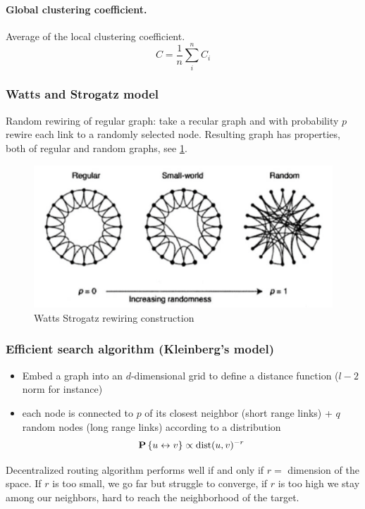 \paragraph{Global clustering coefficient.}
  Average of the local clustering coefficient.
  \[
    C = \frac 1 n \sum_i^n C_i
  \]

\subsubsection{Watts and Strogatz model}

Random rewiring of regular graph: take a recular graph and with probability $p$ rewire each link to a randomly selected node. Resulting graph has properties, both of regular and random graphs, see \cref{fig:watts_strogatz}.

\begin{figure}
  \centering
  \includegraphics[width=1\linewidth]{figures/watts_strogatz_graph.png}
  \caption{Watts Strogatz rewiring construction}
  \label{fig:watts_strogatz}
\end{figure}

\subsubsection{Efficient search algorithm (Kleinberg’s model)}

\begin{itemize}
  \item Embed a graph into an $d$-dimensional grid to define a distance function ($l-2$ norm for instance)
  \item each node is connected to $p$ of its closest neighbor (short range links) + $q$ random nodes (long range links) according to a distribution
  \[
    \P{u \leftrightarrow v} \propto \text{dist}(u,v)^{-r}
  \]
\end{itemize}

Decentralized routing algorithm performs well if and only if $r=$ dimension of the space. If $r$ is too small, we go far but struggle to converge, if $r$ is too high we stay among our neighbors, hard to reach the neighborhood of the target.


